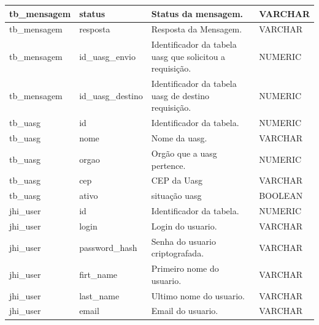 \begin{landscape}
\begin{table}[ht]
\begin{tabular}{|l|l|l|l|}
			tb\_mensagem   & status                    & Status da mensagem.                                                    & VARCHAR      \\ \hline
			tb\_mensagem   & resposta                  & Resposta da Mensagem.                                                  & VARCHAR      \\ \hline
			tb\_mensagem   & id\_uasg\_envio           & Identificador da tabela uasg que solicitou a requisição.               & NUMERIC      \\ \hline
			tb\_mensagem   & id\_uasg\_destino         & Identificador da tabela uasg de destino requisição.                    & NUMERIC      \\ \hline
			tb\_uasg       & id                        & Identificador da tabela.                                               & NUMERIC      \\ \hline
			tb\_uasg       & nome                      & Nome da uasg.                                                          & VARCHAR      \\ \hline
			tb\_uasg       & orgao                     & Orgão que a uasg pertence.                                             & NUMERIC      \\ \hline
			tb\_uasg       & cep                       & CEP da Uasg                                                            & VARCHAR      \\ \hline
			tb\_uasg       & ativo                     & situação uasg                                                          & BOOLEAN      \\ \hline
			jhi\_user      & id                        & Identificador da tabela.                                               & NUMERIC      \\ \hline
			jhi\_user      & login                     & Login do usuario.                                                      & VARCHAR      \\ \hline
			jhi\_user      & password\_hash            & Senha do usuario criptografada.                                        & VARCHAR      \\ \hline
			jhi\_user      & firt\_name                & Primeiro nome do usuario.                                              & VARCHAR      \\ \hline
			jhi\_user      & last\_name                & Ultimo nome do usuario.                                                & VARCHAR      \\ \hline
			jhi\_user      & email                     & Email do usuario.                                                      & VARCHAR      \\ \hline

\end{tabular}
\end{table}
\end{landscape}
